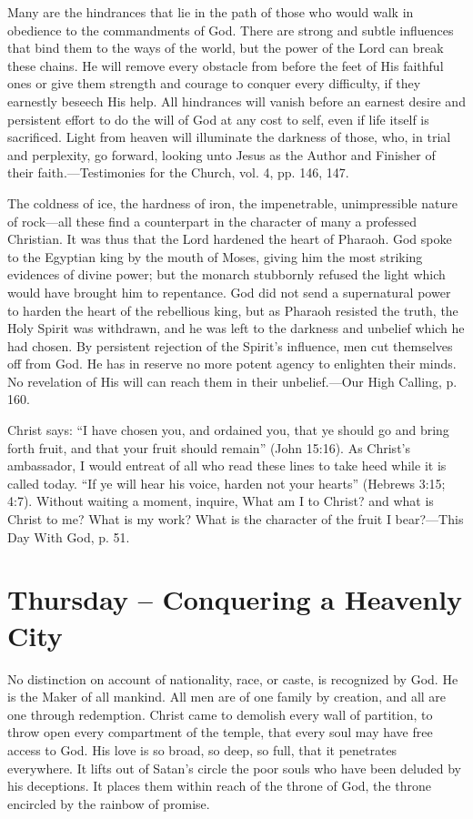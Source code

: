 \documentclass[a4paper, 10pt, twoside, headings=small]{scrartcl}
\begin{document}
\begin{multicols}{2}
Many are the hindrances that lie in the path of those who would walk in obedience to the commandments of God. There are strong and subtle influences that bind them to the ways of the world, but the power of the Lord can break these chains. He will remove every obstacle from before the feet of His faithful ones or give them strength and courage to conquer every difficulty, if they earnestly beseech His help. All hindrances will vanish before an earnest desire and persistent effort to do the will of God at any cost to self, even if life itself is sacrificed. Light from heaven will illuminate the darkness of those, who, in trial and perplexity, go forward, looking unto Jesus as the Author and Finisher of their faith.—Testimonies for the Church, vol. 4, pp. 146, 147.

The coldness of ice, the hardness of iron, the impenetrable, unimpressible nature of rock—all these find a counterpart in the character of many a professed Christian. It was thus that the Lord hardened the heart of Pharaoh. God spoke to the Egyptian king by the mouth of Moses, giving him the most striking evidences of divine power; but the monarch stubbornly refused the light which would have brought him to repentance. God did not send a supernatural power to harden the heart of the rebellious king, but as Pharaoh resisted the truth, the Holy Spirit was withdrawn, and he was left to the darkness and unbelief which he had chosen. By persistent rejection of the Spirit’s influence, men cut themselves off from God. He has in reserve no more potent agency to enlighten their minds. No revelation of His will can reach them in their unbelief.—Our High Calling, p. 160.

Christ says: “I have chosen you, and ordained you, that ye should go and bring forth fruit, and that your fruit should remain” (John 15:16). As Christ’s ambassador, I would entreat of all who read these lines to take heed while it is called today. “If ye will hear his voice, harden not your hearts” (Hebrews 3:15; 4:7). Without waiting a moment, inquire, What am I to Christ? and what is Christ to me? What is my work? What is the character of the fruit I bear?—This Day With God, p. 51.

\section*{Thursday – Conquering a Heavenly City}

No distinction on account of nationality, race, or caste, is recognized by God. He is the Maker of all mankind. All men are of one family by creation, and all are one through redemption. Christ came to demolish every wall of partition, to throw open every compartment of the temple, that every soul may have free access to God. His love is so broad, so deep, so full, that it penetrates everywhere. It lifts out of Satan’s circle the poor souls who have been deluded by his deceptions. It places them within reach of the throne of God, the throne encircled by the rainbow of promise.


\end{multicols}
\end{document}
